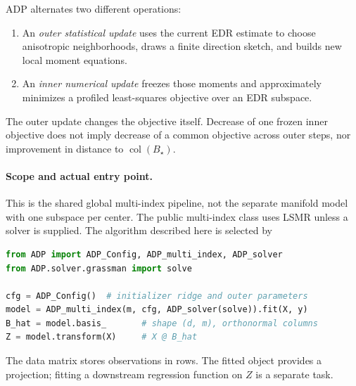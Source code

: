 \documentclass[11pt,a4paper]{article}
\newcommand{\col}{\operatorname{col}}
\newcommand{\code}[1]{\texttt{\detokenize{#1}}}
\begin{document}
ADP alternates two different operations:
\begin{enumerate}
\item An \emph{outer statistical update} uses the current EDR estimate to
choose anisotropic neighborhoods, draws a finite direction sketch, and builds
new local moment equations.
\item An \emph{inner numerical update} freezes those moments and approximately
minimizes a profiled least-squares objective over an EDR subspace.
\end{enumerate}
The outer update changes the objective itself. Decrease of one frozen inner
objective does not imply decrease of a common objective across outer steps,
nor improvement in distance to $\col(B_\star)$.

\paragraph{Scope and actual entry point.}
This is the shared global multi-index pipeline, not the separate manifold
model with one subspace per center. The public multi-index class uses LSMR
unless a solver is supplied. The algorithm described here is selected by
\begin{lstlisting}[language=Python]
from ADP import ADP_Config, ADP_multi_index, ADP_solver
from ADP.solver.grassman import solve

cfg = ADP_Config()  # initializer ridge and outer parameters
model = ADP_multi_index(m, cfg, ADP_solver(solve)).fit(X, y)
B_hat = model.basis_       # shape (d, m), orthonormal columns
Z = model.transform(X)     # X @ B_hat
\end{lstlisting}
The data matrix \code{X} stores observations in rows. The fitted object
provides a projection; fitting a downstream regression function on $Z$ is
a separate task.
\end{document}
